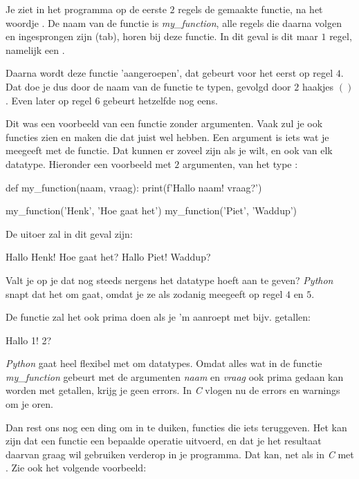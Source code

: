 Je ziet in het programma op de eerste $2$ regels de gemaakte functie, na het woordje . De naam van de functie is \textit{my\_function}, alle regels die daarna volgen en ingesprongen zijn (tab), horen bij deze functie. 
In dit geval is dit maar $1$ regel, namelijk een . \newline

Daarna wordt deze functie 'aangeroepen', dat gebeurt voor het eerst op regel $4$. Dat doe je dus door de naam van de functie te typen, gevolgd door $2$ haakjes $( )$. Even later op regel $6$ gebeurt hetzelfde nog eens. \newline

Dit was een voorbeeld van een functie zonder argumenten. Vaak zul je ook functies zien en maken die dat juist wel hebben. Een argument is iets wat je meegeeft met de functie. Dat kunnen er zoveel zijn als je wilt, en ook van elk datatype. Hieronder een voorbeeld met $2$ argumenten, van het type :

\begin{python}
def my_function(naam, vraag):
    print(f'Hallo {naam}! {vraag}?') 

my_function('Henk', 'Hoe gaat het')
my_function('Piet', 'Waddup')
\end{python}
De uitoer zal in dit geval zijn:
\begin{python}
Hallo Henk! Hoe gaat het?
Hallo Piet! Waddup?
\end{python}

Valt je op je dat nog steeds nergens het datatype hoeft aan te geven? \textit{Python} snapt dat het om  gaat, omdat je ze als zodanig meegeeft op regel $4$ en $5$. 

\begin{remark}
De functie zal het ook prima doen als je 'm aanroept met bijv. getallen: \newline 
{}
\begin{python}
Hallo 1! 2?
\end{python}
\textit{Python} gaat heel flexibel met om datatypes. Omdat alles wat in de functie \textit{my\_function} gebeurt met de argumenten \textit{naam} en \textit{vraag} ook prima gedaan kan worden met getallen, krijg je geen errors. In \textit{C} vlogen nu de errors en warnings om je oren.
\end{remark}

\newpage

Dan rest ons nog een ding om in te duiken, functies die iets teruggeven. Het kan zijn dat een functie een bepaalde operatie uitvoerd, en dat je het resultaat daarvan graag wil gebruiken verderop in je programma. Dat kan, net als in \textit{C} met . Zie ook het volgende voorbeeld:


